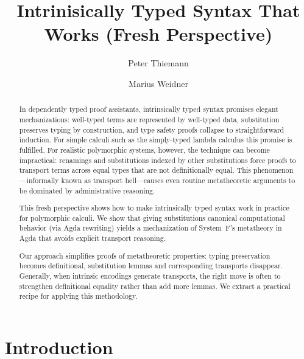 \documentclass[manuscript,screen,review,anonymous,acmsmall]{acmart}
\begin{document}
\title{Intrinisically Typed Syntax That Works (Fresh Perspective)}

\author{Peter Thiemann}

\author{Marius Weidner}

\begin{abstract}
In dependently typed proof
assistants, intrinsically typed syntax promises elegant mechanizations: well-typed
terms are represented by well-typed data, substitution preserves
typing by construction, and type safety proofs collapse to
straightforward induction. For simple calculi such as the simply-typed
lambda calculus this promise is fulfilled. For realistic polymorphic systems, however,
the technique can become impractical: renamings and substitutions
indexed by other substitutions force proofs to transport terms across
equal types that are not definitionally equal. This
phenomenon---informally known as transport hell---causes even routine
metatheoretic arguments to be dominated by administrative reasoning.  

This fresh perspective shows how to make intrinsically typed syntax
work in practice for polymorphic calculi. We show that giving substitutions canonical
computational behavior (via Agda rewriting) yields a
mechanization of System~F's metatheory in Agda that avoids
explicit transport reasoning.
 
Our approach simplifies proofs of metatheoretic
properties: typing preservation becomes definitional, substitution lemmas and corresponding
transports disappear. Generally, when intrinsic encodings generate transports, the right move
is often  to strengthen definitional equality rather than add more lemmas. We extract a practical
recipe for applying this methodology. 
\end{abstract}


\maketitle
{}

\section{Introduction}
\label{sec:introduction}
\end{document}
